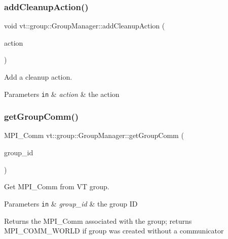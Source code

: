 \subsubsection{\texorpdfstring{add\+Cleanup\+Action()}{addCleanupAction()}}
{\footnotesize\ttfamily void vt\+::group\+::\+Group\+Manager\+::add\+Cleanup\+Action (\begin{DoxyParamCaption}\item[{\hyperlink{namespacevt_ae0a5a7b18cc99d7b732cb4d44f46b0f3}{Action\+Type}}]{action }\end{DoxyParamCaption})}



Add a cleanup action. 


\begin{DoxyParams}[1]{Parameters}
\mbox{\tt in}  & {\em action} & the action \\
\hline
\end{DoxyParams}
\mbox{\label{structvt_1_1group_1_1_group_manager_aeb28b3e11f8901329a9a0c3bddd926f6}} 
\subsubsection{\texorpdfstring{get\+Group\+Comm()}{getGroupComm()}}
{\footnotesize\ttfamily M\+P\+I\+\_\+\+Comm vt\+::group\+::\+Group\+Manager\+::get\+Group\+Comm (\begin{DoxyParamCaption}\item[{\hyperlink{namespacevt_a27b5e4411c9b6140c49100e050e2f743}{Group\+Type} const \&}]{group\+\_\+id }\end{DoxyParamCaption})}



Get M\+P\+I\+\_\+\+Comm from VT group. 


\begin{DoxyParams}[1]{Parameters}
\mbox{\tt in}  & {\em group\+\_\+id} & the group ID\\
\hline
\end{DoxyParams}
\begin{DoxyReturn}{Returns}
the M\+P\+I\+\_\+\+Comm associated with the group; returns {\ttfamily M\+P\+I\+\_\+\+C\+O\+M\+M\+\_\+\+W\+O\+R\+LD} if group was created without a communicator 
\end{DoxyReturn}
\mbox{\label{structvt_1_1group_1_1_group_manager_ac8a02606998928c4d688386cddf0d3e0}} 
